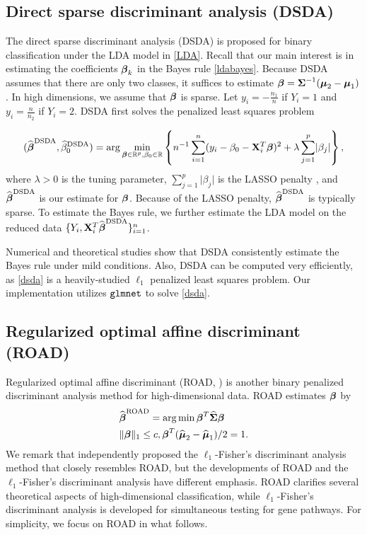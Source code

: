 \subsection{Direct sparse discriminant analysis (DSDA)}


The direct sparse discriminant analysis (DSDA) is proposed for binary classification under the LDA model in \eqref{LDA}. Recall that our main interest is in estimating the coefficients $\boldsymbol{\beta}_k$ in the Bayes rule \eqref{ldabayes}. Because DSDA assumes that there are only two classes, it suffices to estimate $\boldsymbol{\beta}=\boldsymbol{\Sigma}^{-1}(\boldsymbol{\mu}_2-\boldsymbol{\mu}_1)$. In high dimensions, we assume that $\boldsymbol{\beta}$ is sparse. Let $y_i=-\frac{n_1}{n}$ if $Y_i=1$ and $y_i=\frac{n}{n_2}$ if $Y_i=2$. DSDA first solves the penalized least squares problem

\begin{equation}\label{dsda}
(\widehat{\boldsymbol{\beta}}^{\text{DSDA}},\widehat\beta_0^{\text{DSDA}})=\arg\min_{\boldsymbol{\beta}\in\mathbb{R}^p, \beta_0\in\mathbb{R}}\left\{ n^{-1}\sum_{i=1}^n(y_i-\beta_0-\mathbf{X}_i^T\boldsymbol{\beta})^2+\lambda\sum_{j=1}^p\lvert\beta_j\rvert\right\},
\end{equation} 
where $\lambda>0$ is the tuning parameter, $\sum_{j=1}^p\lvert\beta_j\rvert$ is the LASSO penalty \citep{Tibshirani1996}, and $\widehat{\boldsymbol{\beta}}^{\text{DSDA}}$ is our estimate for $\boldsymbol{\beta}$. Because of the LASSO penalty, $\widehat{\boldsymbol{\beta}}^{\text{DSDA}}$ is typically sparse. To estimate the Bayes rule, we further estimate the LDA model on the reduced data $\{Y_i,\mathbf{X}_i^T\widehat{\boldsymbol{\beta}}^{\text{DSDA}}\}_{i=1}^n$. 



Numerical and theoretical studies show that DSDA consistently estimate the Bayes rule under mild conditions. Also, DSDA can be computed very efficiently, as \eqref{dsda} is a heavily-studied $\ell_1$ penalized least squares problem. Our implementation  utilizes $\tt glmnet$ to solve \eqref{dsda}.


\subsection{Regularized optimal affine discriminant (ROAD)}



Regularized optimal affine discriminant (ROAD, \cite{ROAD}) is another binary penalized discriminant analysis method for high-dimensional data. ROAD estimates $\boldsymbol{\beta}$ by
\begin{align}\label{ROAD}
&\widehat{\boldsymbol{\beta}}^{\text{ROAD}}=\arg\min\boldsymbol{\beta}^T\widehat{\boldsymbol{\Sigma}}\boldsymbol{\beta} \\
&\Vert \boldsymbol{\beta}\Vert_1\leq c, \boldsymbol{\beta}^T(\widehat{\boldsymbol{\mu}}_2-\widehat{\boldsymbol{\mu}}_1)/2=1.
\end{align}
We remark that \cite{wu2009sparse} independently proposed the $\ell_1$-Fisher's discriminant analysis method that closely resembles ROAD, but the developments of ROAD and the $\ell_1$-Fisher's discriminant analysis have different emphasis. ROAD clarifies several theoretical aspects of high-dimensional classification, while $\ell_1$-Fisher's discriminant analysis is developed for simultaneous testing for gene pathways. For simplicity, we focus on ROAD in what follows.  

